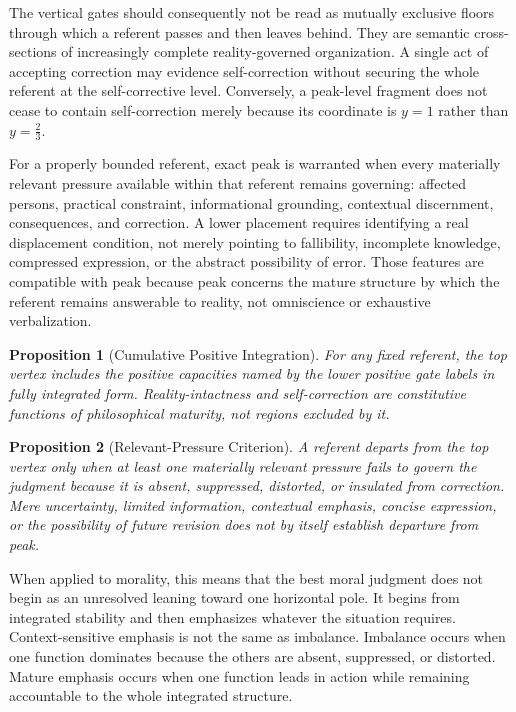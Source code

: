 \documentclass[11pt]{article}
\newtheorem{proposition}{Proposition}
\begin{document}
The vertical gates should consequently not be read as mutually exclusive floors through which a referent passes and then leaves behind. They are semantic cross-sections of increasingly complete reality-governed organization. A single act of accepting correction may evidence self-correction without securing the whole referent at the self-corrective level. Conversely, a peak-level fragment does not cease to contain self-correction merely because its coordinate is $y=1$ rather than $y=\frac{2}{3}$.

For a properly bounded referent, exact peak is warranted when every materially relevant pressure available within that referent remains governing: affected persons, practical constraint, informational grounding, contextual discernment, consequences, and correction. A lower placement requires identifying a real displacement condition, not merely pointing to fallibility, incomplete knowledge, compressed expression, or the abstract possibility of error. Those features are compatible with peak because peak concerns the mature structure by which the referent remains answerable to reality, not omniscience or exhaustive verbalization.

\begin{proposition}[Cumulative Positive Integration]
For any fixed referent, the top vertex includes the positive capacities named by the lower positive gate labels in fully integrated form. Reality-intactness and self-correction are constitutive functions of philosophical maturity, not regions excluded by it.
\end{proposition}

\begin{proposition}[Relevant-Pressure Criterion]
A referent departs from the top vertex only when at least one materially relevant pressure fails to govern the judgment because it is absent, suppressed, distorted, or insulated from correction. Mere uncertainty, limited information, contextual emphasis, concise expression, or the possibility of future revision does not by itself establish departure from peak.
\end{proposition}

When applied to morality, this means that the best moral judgment does not begin as an unresolved leaning toward one horizontal pole. It begins from integrated stability and then emphasizes whatever the situation requires. Context-sensitive emphasis is not the same as imbalance. Imbalance occurs when one function dominates because the others are absent, suppressed, or distorted. Mature emphasis occurs when one function leads in action while remaining accountable to the whole integrated structure.
\end{document}
